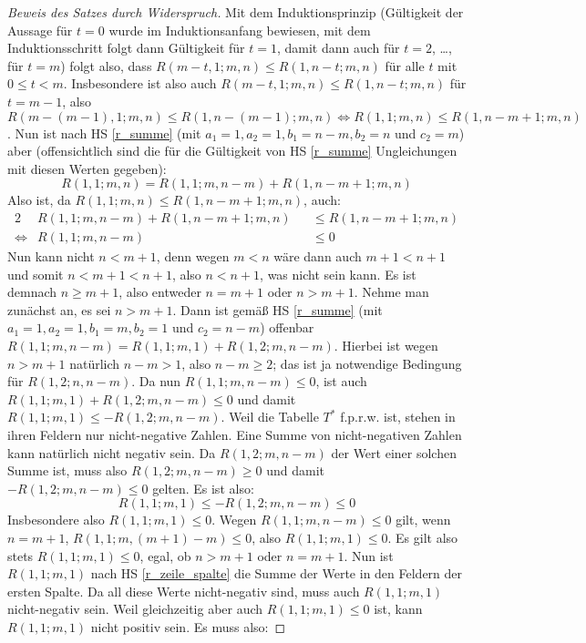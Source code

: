 \begin{proof}[Beweis des Satzes durch Widerspruch]
    Mit dem Induktionsprinzip (Gültigkeit der Aussage für $t=0$ wurde im Induktionsanfang bewiesen, mit dem 
    Induktionsschritt folgt dann Gültigkeit für $t=1$, damit dann auch für $t=2$, \dots, für $t=m$) folgt also, dass 
    $R(m-t, 1; m, n)\leq R(1, n-t; m, n)$ für alle $t$ mit $0\leq t<m$. Insbesondere ist also auch $R(m-t, 1; m, n)
    \leq R(1, n-t; m, n)$ für $t=m-1$, also $R(m-(m-1), 1; m, n)\leq R(1, n-(m-1); m, n)\Leftrightarrow R(1, 1; 
    m, n)\leq R(1, n-m+1; m, n)$. Nun ist nach HS \ref{r_summe} (mit $a_1=1, a_2=1, b_1=n-m, b_2=n$  und 
    $c_2=m$) aber (offensichtlich sind die für die Gültigkeit von HS \ref{r_summe} Ungleichungen mit diesen 
    Werten gegeben):
    \[
    R(1, 1; m, n)=R(1, 1; m, n-m)+R(1, n-m+1; m, n)
    \]
    Also ist, da $R(1, 1; m, n)\leq R(1, n-m+1; m, n)$, auch:
    \begin{alignat*}{2}
        &R(1, 1; m, n-m)+R(1, n-m+1; m, n)&&\leq R(1, n-m+1; m, n)\\
        \Leftrightarrow &R(1, 1; m, n-m)&&\leq 0
    \end{alignat*}
    Nun kann nicht $n<m+1$, denn wegen $m<n$ wäre dann auch $m+1<n+1$ und somit $n<m+1<n+1$, also 
    $n<n+1$, was nicht sein kann. Es ist demnach $n\geq m+1$, also entweder $n=m+1$ oder $n>m+1$. Nehme man zunächst 
    an, es sei $n>m+1$. Dann ist gemäß HS \ref{r_summe} (mit $a_1=1, a_2=1, b_1=m, b_2=1$ und $c_2=n-m$) 
    offenbar $R(1, 1; m, n-m)=R(1, 1; m, 1)+R(1, 2; m, n-m)$. Hierbei ist wegen $n>m+1$ natürlich $n-m>1$, also 
    $n-m\geq 2$; das ist ja notwendige Bedingung für $R(1, 2; n, n-m)$. Da nun $R(1, 1; m, n-m)\leq 0$, ist auch 
    $R(1, 1; m, 1)+R(1, 2; m, n-m)\leq 0$ und damit $R(1, 1; m, 1)\leq -R(1, 2; m, n-m)$. Weil die Tabelle $T^*$ 
    f.p.r.w. ist, stehen in ihren Feldern nur nicht-negative Zahlen. Eine Summe von nicht-negativen Zahlen kann 
    natürlich nicht negativ sein. Da $R(1, 2; m, n-m)$ der Wert einer solchen Summe ist, muss also $R(1, 2; m, n-m)
    \geq 0$ und damit $-R(1, 2; m, n-m)\leq 0$ gelten. Es ist also:
    \[
    R(1, 1; m, 1)\leq -R(1, 2; m, n-m)\leq 0
    \]
    Insbesondere also $R(1, 1; m, 1)\leq 0$. Wegen $R(1, 1; m, n-m)\leq 0$ gilt, wenn $n=m+1$, $R(1, 1; m, (m+1)-m)
    \leq 0$, also $R(1, 1; m, 1)\leq 0$. Es gilt also stets $R(1, 1; m, 1)\leq 0$, egal, ob $n>m+1$ oder $n=m+1$. 
    Nun ist $R(1, 1; m, 1)$ nach HS \ref{r_zeile_spalte} die Summe der Werte in den Feldern der ersten Spalte. Da 
    all diese Werte nicht-negativ sind, muss auch $R(1, 1; m, 1)$ nicht-negativ sein. Weil gleichzeitig aber auch 
    $R(1, 1; m, 1)\leq 0$ ist, kann $R(1, 1; m, 1)$ nicht positiv sein. Es muss also:

\end{proof}
